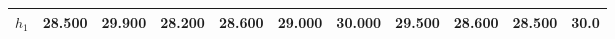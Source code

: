 
        \begin{tabular}{c|*{10}{c}}
            \hline
            \hline
                \(h_{1}\) & 28.500 & 29.900 & 28.200 & 28.600 & 29.000 & 30.000 & 29.500 & 28.600 & 28.500 & 30.0 \\
            \hline
            
            \hline
            \hline
        \end{tabular}
        
